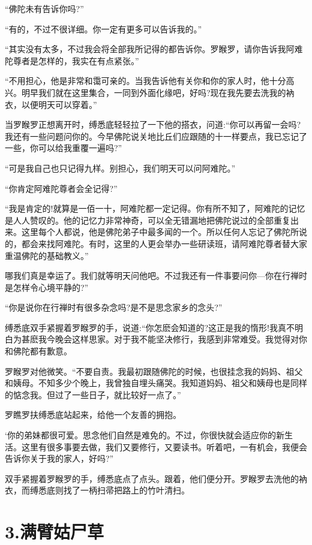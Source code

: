 \documentclass[12pt,twoside,openany]{book}
\begin{document}
“佛陀未有告诉你吗?”

“有的，不过不很详细。你一定有更多可以告诉我的。”

“其实没有太多，不过我会将全部我所记得的都告诉你。罗睺罗，请你告诉我阿难陀尊者是怎样的，我实在有点紧张。”

“不用担心，他是非常和霭可亲的。当我告诉他有关你和你的家人时，他十分高兴。明早我们就在这里集合，一同到外面化缘吧，好吗?现在我先要去洗我的衲衣，以便明天可以穿着。”

当罗睺罗正想离开时，缚悉底轻轻拉了一下他的搭衣，问道:“你可以再留一会吗?我还有一些问题问你的。今早佛陀说关地比丘们应跟随的十一样要点，我已忘记了一些，你可以给我重覆一遍吗?”

“可是我自己也只记得九样。别担心，我们明天可以问阿难陀。”

“你肯定阿难陀尊者会全记得?”

“我是肯定的!就算是一佰一十，阿难陀都一定记得。你有所不知了，阿难陀的记忆是人人赞叹的。他的记忆力非常神奇，可以全无错漏地把佛陀说过的全部重复出来。这里每个人都说，他是佛陀弟子中最多闻的一个。所以任何人忘记了佛陀所说的，都会来找阿难陀。有时，这里的人更会举办一些研读班，请阿难陀尊者替大家重温佛陀的基础教义。”

哪我们真是幸运了。我们就等明天问他吧。不过我还有一件事要问你—你在行禅时是怎样令心境平静的?”

“你是说你在行禅时有很多杂念吗?是不是思念家乡的念头?”

缚悉底双手紧握着罗睺罗的手，说道:“你怎麽会知道的?这正是我的惰形!我真不明白为甚麽我今晚会这样思家。对于我不能坚决修行，我感到非常难受。我觉得对你和佛陀都有歉意。

罗睺罗对他微笑。“不要自责。我最初跟随佛陀的时候，也很挂念我的妈妈、祖父和姨母。不知多少个晚上，我曾独自埋头痛哭。我知道妈妈、祖父和姨母也是同样的惦念我。但过了一些日子，就比较好一点了。”

罗瞧罗扶缚悉底站起来，给他一个友善的拥抱。

‘你的弟妹都很可爱。思念他们自然是难免的。不过，你很快就会适应你的新生活。这里有很多事要去做，我们又要修行，又要读书。听着吧，一有机会，我便会告诉你关于我的家人，好吗?”

双手紧握着罗睺罗的手，缚悉底点了点头。跟着，他们便分开。罗睺罗去洗他的衲衣，而缚悉底则找了一柄扫帚把路上的竹叶清扫。

\chapter{3.满臂姑尸草}\label{ch3}
\end{document}
